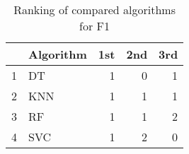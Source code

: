 \begin{table}
\footnotesize
\caption{Ranking of compared algorithms for F1}
\label{tab:places F1}
\begin{tabular}{llrrr}
\hline
 & Algorithm & 1st & 2nd & 3rd \\
\hline
1 & DT & 1 & 0 & 1 \\
2 & KNN & 1 & 1 & 1 \\
3 & RF & 1 & 1 & 2 \\
4 & SVC & 1 & 2 & 0 \\
\hline
\end{tabular}
\end{table}

